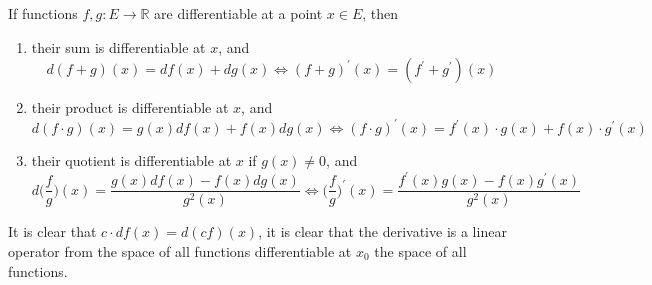     \begin{theorem}
    If functions $f, g: E \longrightarrow \mathbb{R}$ are differentiable at a point $x \in E$, then 
    \begin{enumerate}
      \item their sum is differentiable at $x$, and 
      \[d(f+g) (x) = df(x) + dg(x) \iff (f+g)^\prime (x) = (f^\prime + g^\prime) (x)\]
      \item their product is differentiable at $x$, and 
      \[d (f \cdot g) (x) = g(x) df(x) + f(x) dg(x) \iff (f \cdot g)^\prime (x) = f^\prime (x) \cdot g(x) + f(x) \cdot g^\prime (x)\]
      \item their quotient is differentiable at $x$ if $g(x) \neq 0$, and 
      \[d \Big( \frac{f}{g} \Big) (x) =  \frac{g(x) df(x) - f(x) dg(x)}{g^2 (x)} \iff \bigg(\frac{f}{g}\bigg)^\prime (x) = \frac{f^\prime (x) g(x) - f(x) g^\prime (x)}{g^2 (x)}\]
    \end{enumerate}
    It is clear that $c\cdot df(x) = d (cf)(x)$, it is clear that the derivative is a linear operator from the space of all functions differentiable at $x_0$ the space of all functions. 
    \end{theorem}
